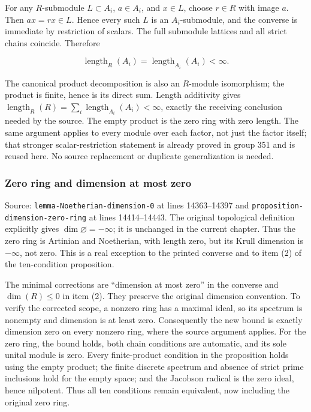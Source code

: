 For any \(R\)-submodule \(L\subset A_i\), \(a\in A_i\), and \(x\in L\), choose \(r\in R\) with image \(a\). Then \(ax=rx\in L\). Hence every such \(L\) is an \(A_i\)-submodule, and the converse is immediate by restriction of scalars. The full submodule lattices and all strict chains coincide. Therefore

\[
\operatorname{length}_R(A_i)=\operatorname{length}_{A_i}(A_i)<\infty.
\]

The canonical product decomposition is also an \(R\)-module isomorphism; the product is finite, hence is its direct sum. Length additivity gives \(\operatorname{length}_R(R)=\sum_i\operatorname{length}_{A_i}(A_i)<\infty\), exactly the receiving conclusion needed by the source. The empty product is the zero ring with zero length. The same argument applies to every module over each factor, not just the factor itself; that stronger scalar-restriction statement is already proved in group 351 and is reused here. No source replacement or duplicate generalization is needed.

\subsubsection{Zero ring and dimension at most zero}\label{algebra-proof-003-zero-ring-and-dimension-at-most-zero}

Source: \texttt{lemma-Noetherian-dimension-0} at lines 14363--14397 and \texttt{proposition-dimension-zero-ring} at lines 14414--14443. The original topological definition explicitly gives \(\dim\varnothing=-\infty\); it is unchanged in the current chapter. Thus the zero ring is Artinian and Noetherian, with length zero, but its Krull dimension is \(-\infty\), not zero. This is a real exception to the printed converse and to item (2) of the ten-condition proposition.

The minimal corrections are ``dimension at most zero'' in the converse and \(\dim(R)\leq0\) in item (2). They preserve the original dimension convention. To verify the corrected scope, a nonzero ring has a maximal ideal, so its spectrum is nonempty and dimension is at least zero. Consequently the new bound is exactly dimension zero on every nonzero ring, where the source argument applies. For the zero ring, the bound holds, both chain conditions are automatic, and its sole unital module is zero. Every finite-product condition in the proposition holds using the empty product; the finite discrete spectrum and absence of strict prime inclusions hold for the empty space; and the Jacobson radical is the zero ideal, hence nilpotent. Thus all ten conditions remain equivalent, now including the original zero ring.


